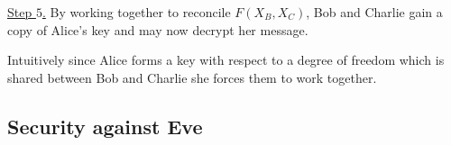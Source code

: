 \noindent \underline{Step $5$.} By working together to reconcile $F\left(X_B, X_C\right)$, Bob and Charlie gain a copy of Alice's key and may now decrypt her message.

Intuitively since Alice forms a key with respect to a degree of freedom which is shared between Bob and Charlie she forces them to work together.



\subsection{Security against Eve}
